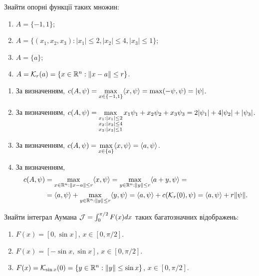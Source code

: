 \begin{solution}
\end{solution}


\begin{problem}
    Знайти опорні функції таких множин:
    \begin{enumerate}
        \item $A = \{ -1, 1 \}$;
        \item $A = \{ (x_1, x_2, x_3) : |x_1| \le 2, |x_2| \le  4, |x_3| \le 1 \}$;
        \item $A = \{ a \}$;
        \item $A = \mathcal{K}_r(a) = \{ x\in \mathbb{R}^n : \| x - a \| \le r \}$.
    \end{enumerate}
\end{problem}

\begin{solution}
    \begin{enumerate}
        \item За визначенням, $c(A, \psi) = \displaystyle\max\limits_{x \in \{-1, 1\}} \langle x, \psi\rangle = \max(-\psi,\psi) = |\psi|$.
        \item За визначенням, $c(A, \psi) = \displaystyle\max\limits_{\substack{ x_1 : |x_1| \le 2 \\ x_2 : |x_2| \le  4 \\ x_3 : |x_3| \le 1 }} x_1 \psi_1 + x_2 \psi_2 + x_3 \psi_3  = 2 |\psi_1| + 4 |\psi_2| + |\psi_3|$.
        \item За визначенням, $c(A, \psi) = \displaystyle\max\limits_{x \in \{ a \}} \langle x, \psi\rangle = \langle a, \psi\rangle $.
        \item За визначенням, 
        \begin{align*}
            c(A, \psi) &= \displaystyle\max\limits_{x \in \mathbb{R}^n : \| x - a \| \le r} \langle x, \psi\rangle = \displaystyle\max\limits_{y \in \mathbb{R}^n : \| y \| \le r} \langle a + y, \psi\rangle = \\
            &= \langle a, \psi\rangle + \displaystyle\max\limits_{y \in \mathbb{R}^n : \| y \| \le r} \langle y, \psi\rangle = \langle a, \psi\rangle + c(\mathcal{K}_r(0), \psi) = \langle a, \psi \rangle + r\|\psi\|.
        \end{align*}
    \end{enumerate}
\end{solution}

\begin{problem}
    Знайти інтеграл Аумана $\mathcal{J} = \int_0^{\pi/2} F(x) dx$ таких багатозначних відображень:
    \begin{enumerate}
        \item $F(x) = [0, \sin x]$, $x \in [0, \pi / 2]$.
        \item $F(x) = [-\sin x, \sin x]$, $x \in [0, \pi / 2]$.
        \item $F(x) = \mathcal{K}_{\sin x}(0) = \{ y \in \mathbb{R}^n : \| y \| \le \sin x \}$, $x \in [0, \pi / 2]$.
    \end{enumerate}
\end{problem}

